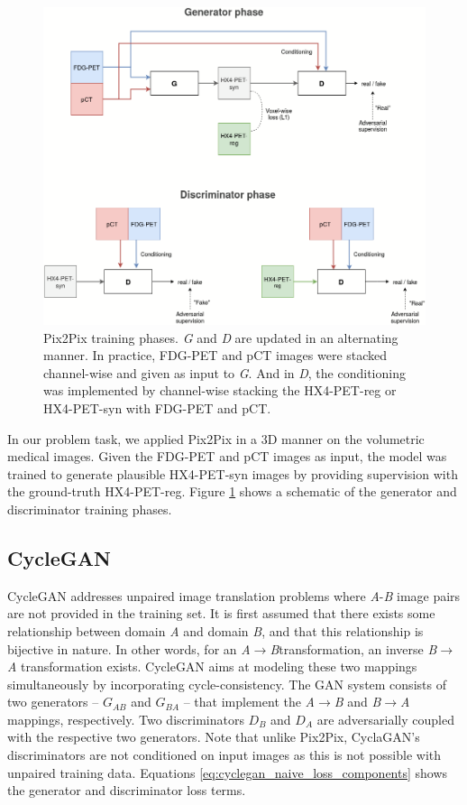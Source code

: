 \begin{figure}[h!]
    \centering
    \includegraphics[width=\linewidth]{figures/GANs/Pix2Pix.png}
    \caption{Pix2Pix training phases. \textit{G} and \textit{D} are updated in an alternating manner. In practice, FDG-PET and pCT images were stacked channel-wise and given as input to \textit{G}. And in \textit{D}, the conditioning was implemented by channel-wise stacking the HX4-PET-reg or HX4-PET-syn with FDG-PET and pCT.}
    \label{fig:pix2pix}
\end{figure}{}

In our problem task, we applied Pix2Pix in a 3D manner on the volumetric medical images. Given the FDG-PET and pCT images as input, the model was trained to generate plausible HX4-PET-syn images by providing supervision with the ground-truth HX4-PET-reg. Figure \ref{fig:pix2pix} shows a schematic of the generator and discriminator training phases.


\subsection{CycleGAN}
\label{cyclegan}

CycleGAN addresses unpaired image translation problems where \textit{A}-\textit{B} image pairs are not provided in the training set. It is first assumed that there exists some relationship between domain \textit{A} and domain \textit{B}, and that this relationship is bijective in nature. In other words, for an \textit{A}$\rightarrow$\textit{B}transformation, an inverse \textit{B}$\rightarrow$\textit{A} transformation exists. CycleGAN aims at modeling these two mappings simultaneously by incorporating cycle-consistency. The GAN system consists of two generators -- $G_{AB}$ and $G_{BA}$ -- that implement the \textit{A}$\rightarrow$\textit{B} and \textit{B}$\rightarrow$\textit{A} mappings, respectively. Two discriminators $D_B$ and $D_A$ are adversarially coupled with the respective two generators. Note that unlike Pix2Pix, CyclaGAN's discriminators are not conditioned on input images as this is not possible with unpaired training data. Equations \ref{eq:cyclegan_naive_loss_components} shows the generator and discriminator loss terms.

